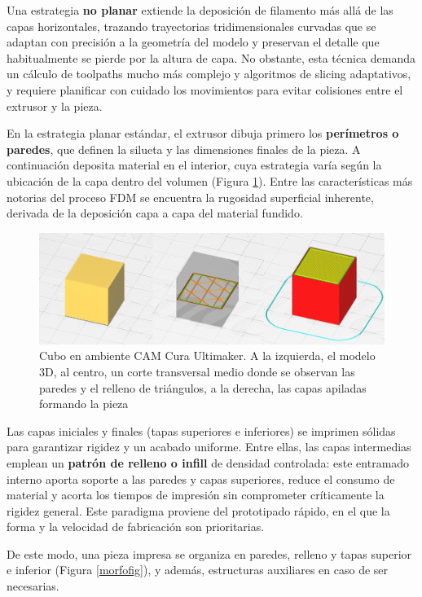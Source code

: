 Una estrategia \textbf{no planar} extiende la deposición de filamento más allá de las capas horizontales, trazando trayectorias tridimensionales curvadas que se adaptan con precisión a la geometría del modelo y preservan el detalle que habitualmente se pierde por la altura de capa. No obstante, esta técnica demanda un cálculo de toolpaths mucho más complejo y algoritmos de slicing adaptativos, y requiere planificar con cuidado los movimientos para evitar colisiones entre el extrusor y la pieza.

En la estrategia planar estándar, el extrusor dibuja primero los \textbf{perímetros o paredes}, que definen la silueta y las dimensiones finales de la pieza. A continuación deposita material en el interior, cuya estrategia varía según la ubicación de la capa dentro del volumen (Figura \ref{fdmfig}). Entre las características más notorias del proceso FDM se encuentra la rugosidad superficial inherente, derivada de la deposición capa a capa del material fundido.

\begin{figure}[h!]
	\centering
	\includegraphics[width=0.8\linewidth]{imgs/fdm.png}
	\caption{Cubo en ambiente CAM Cura Ultimaker. A la izquierda, el modelo 3D, al centro, un corte transversal medio donde se observan las paredes y el relleno de triángulos, a la derecha, las capas apiladas formando la pieza}
	\label{fdmfig}
\end{figure} 

Las capas iniciales y finales (tapas superiores e inferiores) se imprimen sólidas para garantizar rigidez y un acabado uniforme. Entre ellas, las capas intermedias emplean un \textbf{patrón de relleno o infill} de densidad controlada: este entramado interno aporta soporte a las paredes y capas superiores, reduce el consumo de material y acorta los tiempos de impresión sin comprometer críticamente la rigidez general. Este paradigma proviene del prototipado rápido, en el que la forma y la velocidad de fabricación son prioritarias.

De este modo, una pieza impresa se organiza en paredes, relleno y tapas superior e inferior (Figura \ref{morfofig}), y además, estructuras auxiliares en caso de ser necesarias. 

